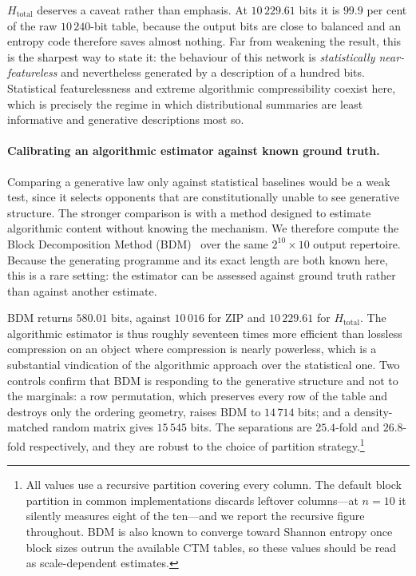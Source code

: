 \documentclass[11pt]{article}
\begin{document}
$H_{\mathrm{total}}$ deserves a caveat rather than emphasis.  At $10\,229.61$
bits it is $99.9$ per cent of the raw $10\,240$-bit table, because the output
bits are close to balanced and an entropy code therefore saves almost nothing.
Far from weakening the result, this is the sharpest way to state it: the
behaviour of this network is \emph{statistically near-featureless} and
nevertheless generated by a description of a hundred bits.  Statistical
featurelessness and extreme algorithmic compressibility coexist here, which is
precisely the regime in which distributional summaries are least informative and
generative descriptions most so.

\paragraph{Calibrating an algorithmic estimator against known ground truth.}
Comparing a generative law only against statistical baselines would be a weak
test, since it selects opponents that are constitutionally unable to see
generative structure.  The stronger comparison is with a method designed to
estimate algorithmic content without knowing the mechanism.  We therefore
compute the Block Decomposition Method (BDM)~\cite{zenildecomposition} over the
same $2^{10}\times 10$ output repertoire.  Because the generating programme and
its exact length are both known here, this is a rare setting: the estimator can
be assessed against ground truth rather than against another estimate.

BDM returns $580.01$ bits, against $10\,016$ for ZIP and $10\,229.61$ for
$H_{\mathrm{total}}$.  The algorithmic estimator is thus roughly seventeen times
more efficient than lossless compression on an object where compression is
nearly powerless, which is a substantial vindication of the algorithmic
approach over the statistical one.  Two controls confirm that BDM is responding
to the generative structure and not to the marginals: a row permutation, which
preserves every row of the table and destroys only the ordering geometry,
raises BDM to $14\,714$ bits; and a density-matched random matrix gives
$15\,545$ bits.  The separations are $25.4$-fold and $26.8$-fold respectively,
and they are robust to the choice of partition strategy.\footnote{All values use
a recursive partition covering every column.  The default block partition in
common implementations discards leftover columns---at $n=10$ it silently
measures eight of the ten---and we report the recursive figure throughout.  BDM
is also known to converge toward Shannon entropy once block sizes outrun the
available CTM tables, so these values should be read as scale-dependent
estimates.}
\end{document}
